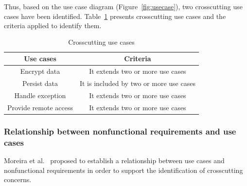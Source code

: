 \documentclass[11pt,twoside]{article}
\begin{document}
Thus, based on the use case diagram (Figure~\ref{fig:usecase}), two crosscutting use cases have been identified. Table~\ref{tab:xUseCases}
presents crosscutting use cases and the criteria applied to identify them.

\begin{table}[!h!t!b]
\begin{footnotesize}
\begin{center}
\begin{tabular}{c|c} \hline
 \textbf{Use cases} & \textbf{Criteria} \\ \hline
Encrypt data & It extends two or more use cases\\ \hline
Persist data & It is included by two or more use cases\\ \hline
Handle exception & It extends two or more use cases\\ \hline
Provide remote access & It extends two or more use cases\\ \hline
\end{tabular}
\end{center}
\end{footnotesize}
\caption{Crosscutting use cases}
\label{tab:xUseCases}
\end{table}

\subsubsection{Relationship between nonfunctional requirements and use cases}
Moreira et al.~\cite{Moreira:2002:CQA} proposed to establish a relationship between use cases and nonfunctional requirements in order to
support the identification of crosscutting concerns.
\end{document}
